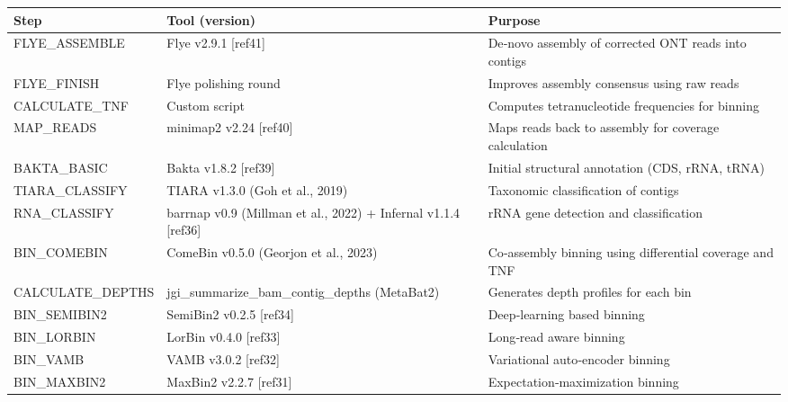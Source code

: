 \documentclass[
  11pt,
]{article}
\newcounter{none} %
\begin{document}
{\def\LTcaptype{none} %
\begin{longtable}[]{@{}
  >{\raggedright\arraybackslash}p{}
  >{\raggedright\arraybackslash}p{}
  >{\raggedright\arraybackslash}p{}@{}}
\toprule\noalign{}
\begin{minipage}[b]{\linewidth}\raggedright
Step
\end{minipage} & \begin{minipage}[b]{\linewidth}\raggedright
Tool (version)
\end{minipage} & \begin{minipage}[b]{\linewidth}\raggedright
Purpose
\end{minipage} \\
\midrule\noalign{}
\endhead
\bottomrule\noalign{}
\endlastfoot
FLYE\_ASSEMBLE & Flye v2.9.1 {[}ref41{]} & De‑novo assembly of corrected
ONT reads into contigs \\
FLYE\_FINISH & Flye polishing round & Improves assembly consensus using
raw reads \\
CALCULATE\_TNF & Custom script & Computes tetranucleotide frequencies
for binning \\
MAP\_READS & minimap2 v2.24 {[}ref40{]} & Maps reads back to assembly
for coverage calculation \\
BAKTA\_BASIC & Bakta v1.8.2 {[}ref39{]} & Initial structural annotation
(CDS, rRNA, tRNA) \\
TIARA\_CLASSIFY & TIARA v1.3.0 (Goh et al., 2019) & Taxonomic
classification of contigs \\
RNA\_CLASSIFY & barrnap v0.9 (Millman et al., 2022) + Infernal v1.1.4
{[}ref36{]} & rRNA gene detection and classification \\
BIN\_COMEBIN & ComeBin v0.5.0 (Georjon et al., 2023) & Co‑assembly
binning using differential coverage and TNF \\
CALCULATE\_DEPTHS & jgi\_summarize\_bam\_contig\_depths (MetaBat2) &
Generates depth profiles for each bin \\
BIN\_SEMIBIN2 & SemiBin2 v0.2.5 {[}ref34{]} & Deep‑learning based
binning \\
BIN\_LORBIN & LorBin v0.4.0 {[}ref33{]} & Long‑read aware binning \\
BIN\_VAMB & VAMB v3.0.2 {[}ref32{]} & Variational auto‑encoder
binning \\
BIN\_MAXBIN2 & MaxBin2 v2.2.7 {[}ref31{]} & Expectation‑maximization
binning \\

\end{longtable}}
\end{document}
